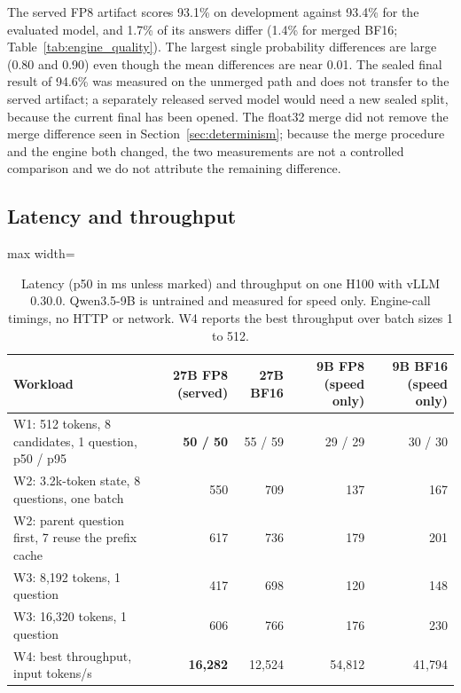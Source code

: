 The served FP8 artifact scores 93.1\% on development against 93.4\% for the evaluated model,
and 1.7\% of its answers differ (1.4\% for merged BF16; Table~\ref{tab:engine_quality}). The
largest single probability differences are large (0.80 and 0.90) even though the mean
differences are near 0.01. The sealed final result of 94.6\% was measured on the unmerged
path and does not transfer to the served artifact; a separately released served model would
need a new sealed split, because the current final has been opened. The float32 merge did not
remove the merge difference seen in Section~\ref{sec:determinism}; because the merge
procedure and the engine both changed, the two measurements are not a controlled comparison
and we do not attribute the remaining difference.

\subsection{Latency and throughput}
\label{sec:engine_latency}

\begin{table}[t]
\centering
\small
\caption{Latency (p50 in ms unless marked) and throughput on one H100 with vLLM 0.30.0.
Qwen3.5-9B is untrained and measured for speed only. Engine-call timings, no HTTP or network.
W4 reports the best throughput over batch sizes 1 to 512.}
\label{tab:engine}
\setlength{\tabcolsep}{4pt}
\begin{adjustbox}{max width=\linewidth}
\begin{tabular}{@{}lrrrr@{}}
\toprule
Workload & 27B FP8 (served) & 27B BF16 & 9B FP8 (speed only) & 9B BF16 (speed only) \\
\midrule
W1: 512 tokens, 8 candidates, 1 question, p50 / p95 & \textbf{50 / 50} & 55 / 59 & 29 / 29 & 30 / 30 \\
W2: 3.2k-token state, 8 questions, one batch & 550 & 709 & 137 & 167 \\
W2: parent question first, 7 reuse the prefix cache & 617 & 736 & 179 & 201 \\
W3: 8,192 tokens, 1 question & 417 & 698 & 120 & 148 \\
W3: 16,320 tokens, 1 question & 606 & 766 & 176 & 230 \\
W4: best throughput, input tokens/s & \textbf{16,282} & 12,524 & 54,812 & 41,794 \\
\bottomrule
\end{tabular}
\end{adjustbox}
\end{table}

